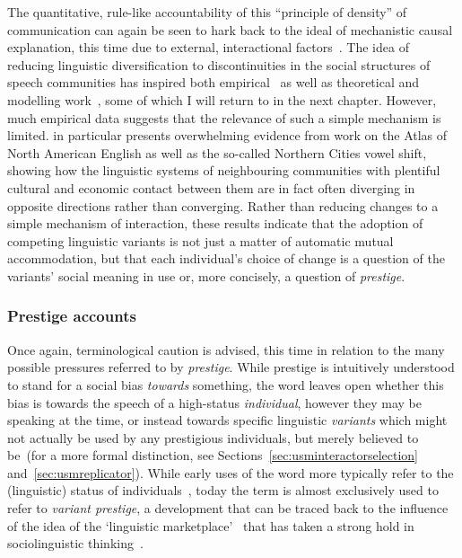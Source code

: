 The quantitative, rule-like accountability of this ``principle of density'' of communication can again be seen to hark back to the ideal of mechanistic causal explanation, this time due to external, interactional factors~\citep[p.19]{Labov2001}. The idea of reducing linguistic diversification to discontinuities in the social structures of speech communities has inspired both empirical~\citep{Milroy1985,Herold1997,Trudgill2008} as well as theoretical and modelling work~\citep{Nettle1999,Silva2008,Stadler2009,Gong2012,Blythe2012,Pierrehumbert2014,Renton2016,Kauhanen2018}, some of which I will return to in the next chapter. However, much empirical data suggests that the relevance of such a simple mechanism is limited. \citet[ch.6-10]{Labov2010} in particular presents overwhelming evidence from work on the Atlas of North American English as well as the so-called Northern Cities vowel shift, showing how the linguistic systems of neighbouring communities with plentiful cultural and economic contact between them are in fact often diverging in opposite directions rather than converging. Rather than reducing changes to a simple mechanism of interaction, these results indicate that the adoption of competing linguistic variants is not just a matter of automatic mutual accommodation, but that each individual's choice of change is a question of the variants' social meaning in use or, more concisely, a question of \emph{prestige}.


\subsubsection{Prestige accounts}
\label{sec:prestige}

Once again, terminological caution is advised, this time in relation to the many possible pressures referred to by \emph{prestige}. While prestige is intuitively understood to stand for a social bias \emph{towards} something, the word leaves open whether this bias is towards the speech of a high-status \emph{individual}, however they may be speaking at the time, or instead towards specific linguistic \emph{variants} which might not actually be used by any prestigious individuals, but merely believed to be~(for a more formal distinction, see Sections~\ref{sec:usminteractorselection} and~\ref{sec:usmreplicator}). While early uses of the word more typically refer to the (linguistic) status of individuals~\citep{Tarde1903,Fries1949}, today the term is almost exclusively used to refer to \emph{variant prestige}, a development that can be traced back to the influence of the idea of the `linguistic marketplace'~\citep{Bourdieu1977} that has taken a strong hold in sociolinguistic thinking~\citep{LePage1985,Cedergren1987,Tagliamonte2015}.

